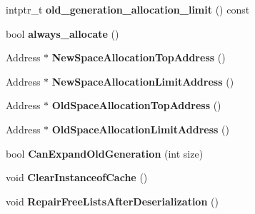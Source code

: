 \begin{DoxyCompactItemize}
\item 
intptr\+\_\+t {\bfseries old\+\_\+generation\+\_\+allocation\+\_\+limit} () const \hypertarget{classv8_1_1internal_1_1_heap_a3d8596b9efaad2b7295c277c081b6952}{}\label{classv8_1_1internal_1_1_heap_a3d8596b9efaad2b7295c277c081b6952}

\item 
bool {\bfseries always\+\_\+allocate} ()\hypertarget{classv8_1_1internal_1_1_heap_ad6ec033a38869520cb70b1a47ae2e25b}{}\label{classv8_1_1internal_1_1_heap_ad6ec033a38869520cb70b1a47ae2e25b}

\item 
Address $\ast$ {\bfseries New\+Space\+Allocation\+Top\+Address} ()\hypertarget{classv8_1_1internal_1_1_heap_a3c6bc4955a8f4fbc6a480f77f5ff702a}{}\label{classv8_1_1internal_1_1_heap_a3c6bc4955a8f4fbc6a480f77f5ff702a}

\item 
Address $\ast$ {\bfseries New\+Space\+Allocation\+Limit\+Address} ()\hypertarget{classv8_1_1internal_1_1_heap_a39ddf64de374b93a01f2fadbed09bc20}{}\label{classv8_1_1internal_1_1_heap_a39ddf64de374b93a01f2fadbed09bc20}

\item 
Address $\ast$ {\bfseries Old\+Space\+Allocation\+Top\+Address} ()\hypertarget{classv8_1_1internal_1_1_heap_a27e92a2ffe54cc417ab53a44d413b822}{}\label{classv8_1_1internal_1_1_heap_a27e92a2ffe54cc417ab53a44d413b822}

\item 
Address $\ast$ {\bfseries Old\+Space\+Allocation\+Limit\+Address} ()\hypertarget{classv8_1_1internal_1_1_heap_af886ec20fde6393dcefe5af98a258795}{}\label{classv8_1_1internal_1_1_heap_af886ec20fde6393dcefe5af98a258795}

\item 
bool {\bfseries Can\+Expand\+Old\+Generation} (int size)\hypertarget{classv8_1_1internal_1_1_heap_a0f564b44b49298edfcc0828370860553}{}\label{classv8_1_1internal_1_1_heap_a0f564b44b49298edfcc0828370860553}

\item 
void {\bfseries Clear\+Instanceof\+Cache} ()\hypertarget{classv8_1_1internal_1_1_heap_a469e15823f6b91b5531365c3ba5ba012}{}\label{classv8_1_1internal_1_1_heap_a469e15823f6b91b5531365c3ba5ba012}

\item 
void {\bfseries Repair\+Free\+Lists\+After\+Deserialization} ()\hypertarget{classv8_1_1internal_1_1_heap_aa0d23316421d3c5b4958c2d2951367b8}{}\label{classv8_1_1internal_1_1_heap_aa0d23316421d3c5b4958c2d2951367b8}


\end{DoxyCompactItemize}
